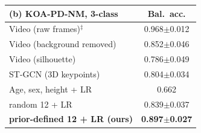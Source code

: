 \begin{tabular}{@{}lc@{}}
\toprule
(b) KOA-PD-NM, 3-class & Bal.\ acc. \\
\midrule
Video (raw frames)$^\ddagger$ & 0.968$\pm$0.012 \\
Video (background removed) & 0.852$\pm$0.046 \\
Video (silhouette) & 0.786$\pm$0.049 \\
ST-GCN (3D keypoints) & 0.804$\pm$0.034 \\
\midrule
Age, sex, height + LR & 0.662 \\
random 12 + LR & 0.839$\pm$0.037 \\
\textbf{prior-defined 12 + LR (ours)} & \textbf{0.897$\pm$0.027} \\
\bottomrule
\end{tabular}
